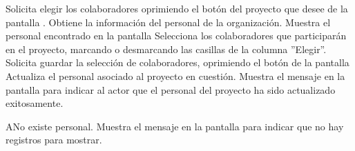	\begin{UCtrayectoria}
		\UCpaso[\UCactor] Solicita elegir los colaboradores oprimiendo el botón  del proyecto que desee de la pantalla .
		\UCpaso[\UCsist] Obtiene la información del personal de la organización. 
		\UCpaso[\UCsist] Muestra el personal encontrado en la pantalla 
		\UCpaso[\UCactor] Selecciona los colaboradores que participarán en el proyecto, marcando o desmarcando las casillas de la columna ''Elegir''.
		\UCpaso[\UCactor] Solicita guardar la selección de colaboradores, oprimiendo el botón  de la pantalla 
		\UCpaso[\UCsist] Actualiza el personal asociado al proyecto en cuestión.
		\UCpaso[\UCsist] Muestra el mensaje  en la pantalla  para indicar al actor que el personal del proyecto ha sido actualizado exitosamente.
	\end{UCtrayectoria}		
		\begin{UCtrayectoriaA}{A}{No existe personal.}
			\UCpaso[\UCsist] Muestra el mensaje  en la pantalla  para indicar que no hay registros para mostrar.
		\end{UCtrayectoriaA}

